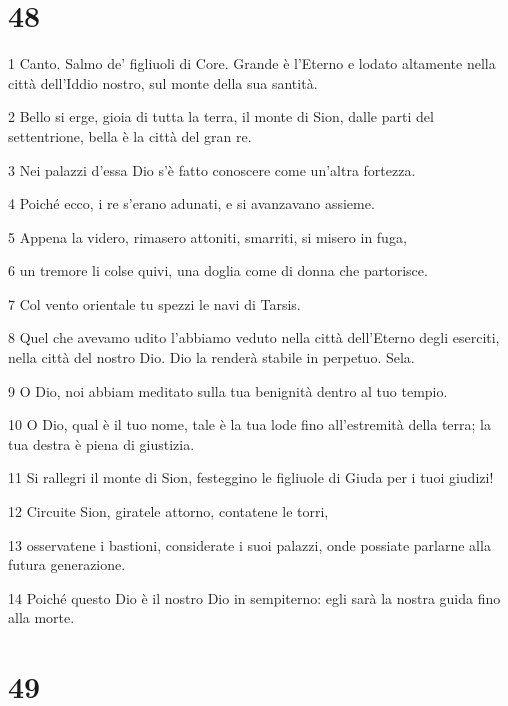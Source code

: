 \chapter{48}

\par 1 Canto. Salmo de' figliuoli di Core. Grande è l'Eterno e lodato altamente nella città dell'Iddio nostro, sul monte della sua santità.
\par 2 Bello si erge, gioia di tutta la terra, il monte di Sion, dalle parti del settentrione, bella è la città del gran re.
\par 3 Nei palazzi d'essa Dio s'è fatto conoscere come un'altra fortezza.
\par 4 Poiché ecco, i re s'erano adunati, e si avanzavano assieme.
\par 5 Appena la videro, rimasero attoniti, smarriti, si misero in fuga,
\par 6 un tremore li colse quivi, una doglia come di donna che partorisce.
\par 7 Col vento orientale tu spezzi le navi di Tarsis.
\par 8 Quel che avevamo udito l'abbiamo veduto nella città dell'Eterno degli eserciti, nella città del nostro Dio. Dio la renderà stabile in perpetuo. Sela.
\par 9 O Dio, noi abbiam meditato sulla tua benignità dentro al tuo tempio.
\par 10 O Dio, qual è il tuo nome, tale è la tua lode fino all'estremità della terra; la tua destra è piena di giustizia.
\par 11 Si rallegri il monte di Sion, festeggino le figliuole di Giuda per i tuoi giudizi!
\par 12 Circuite Sion, giratele attorno, contatene le torri,
\par 13 osservatene i bastioni, considerate i suoi palazzi, onde possiate parlarne alla futura generazione.
\par 14 Poiché questo Dio è il nostro Dio in sempiterno: egli sarà la nostra guida fino alla morte.

\chapter{49}

